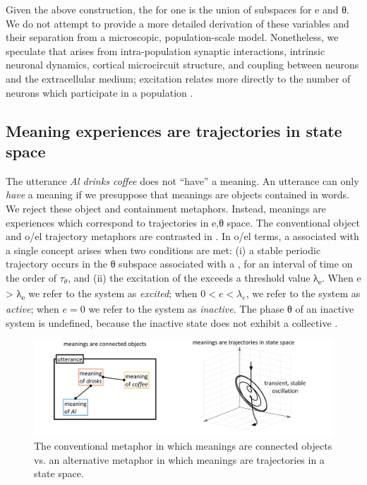   Given the above construction, the  for one  is the union of subspaces for e and θ. We do not attempt to provide a more detailed derivation of these variables and their separation from a microscopic, population-scale model. Nonetheless, we speculate that  arises from intra-pop\-u\-la\-tion synaptic interactions, intrinsic neuronal dynamics, cortical microcircuit structure, and coupling between neurons and the extracellular medium; excitation relates more directly to the number of neurons which participate in a population .  

\subsection{Meaning experiences are trajectories in state space}

The utterance \textit{Al drinks coffee} does not “have” a meaning. An utterance can only \textit{have} a meaning if we presuppose that meanings are objects contained in words. We reject these object and containment metaphors. Instead, meanings are experiences which correspond to trajectories in  e,θ space. The conventional object and o/el trajectory metaphors are contrasted in {}. In o/el terms, a  associated with a single concept arises when two conditions are met: (i) a stable periodic trajectory occurs in the θ subspace associated with a , for an interval of time on the order of $τ_{θ}$, and (ii) the excitation of the  exceeds a threshold value λ\textsubscript{e}. When e > λ\textsubscript{e} we refer to the system as \textit{excited}; when $0 < e < λ_e$, we refer to the system as \textit{active}; when $e = 0$ we refer to the system as \textit{inactive}. The phase θ of an inactive system is undefined, because the inactive state does not exhibit a collective . 

  
\begin{figure}
\includegraphics[width=\textwidth]{figures/Tilsen-img13.png}
\caption{The conventional metaphor in which meanings are connected objects vs. an alternative metaphor in which meanings are trajectories in a state space.}
\label{fig:2:6}
\end{figure}
 
